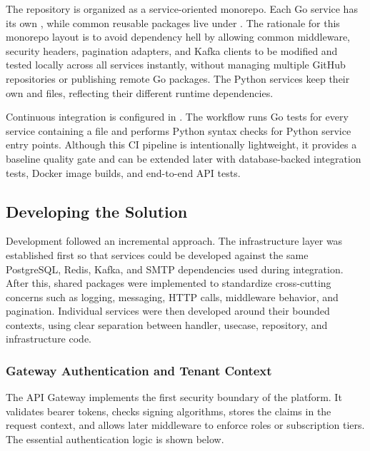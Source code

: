 The repository is organized as a service-oriented monorepo. Each Go service has its own , while common reusable packages live under . The rationale for this monorepo layout is to avoid dependency hell by allowing common middleware, security headers, pagination adapters, and Kafka clients to be modified and tested locally across all services instantly, without managing multiple GitHub repositories or publishing remote Go packages. The Python services keep their own  and  files, reflecting their different runtime dependencies.

Continuous integration is configured in . The workflow runs Go tests for every service containing a  file and performs Python syntax checks for Python service entry points. Although this CI pipeline is intentionally lightweight, it provides a baseline quality gate and can be extended later with database-backed integration tests, Docker image builds, and end-to-end API tests.

\subsection{Developing the Solution}
Development followed an incremental approach. The infrastructure layer was established first so that services could be developed against the same PostgreSQL, Redis, Kafka, and SMTP dependencies used during integration. After this, shared packages were implemented to standardize cross-cutting concerns such as logging, messaging, HTTP calls, middleware behavior, and pagination. Individual services were then developed around their bounded contexts, using clear separation between handler, usecase, repository, and infrastructure code.

\subsubsection{Gateway Authentication and Tenant Context}
The API Gateway implements the first security boundary of the platform. It validates bearer tokens, checks signing algorithms, stores the claims in the request context, and allows later middleware to enforce roles or subscription tiers. The essential authentication logic is shown below.

